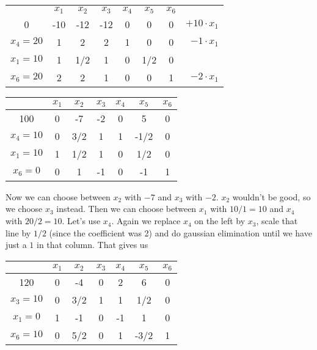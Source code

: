 \begin{Ex}
\begin{center}
\begin{tabular}{c|ccccccr}
  & $x_1$ & $x_2$ & $x_3$ & $x_4$ & $x_5$ & $x_6$ \\\cline{1-7}
0 & -10 & -12 & -12 & 0 & 0 & 0 &\hspace{1cm} $+10\cdot x_1$\\\cline{0-6}
$x_4=20$ & 1 & 2   & 2 & 1 &  0   & 0 &\hspace{1cm} $-1\cdot x_1$\\
$x_1=10$ & 1 & 1/2 & 1 & 0 &  1/2 & 0\\
$x_6=20$ & 2 & 2   & 1 & 0 &  0   & 1 &\hspace{1cm} $-2\cdot x_1$\\
\end{tabular}
\end{center}

\begin{center}
\begin{tabular}{c|cccccc}
  & $x_1$ & $x_2$ & $x_3$ & $x_4$ & $x_5$ & $x_6$ \\\hline
100 & 0 & -7 & -2 & 0 & 5 & 0\\\hline
$x_4=10$ & 0 & 3/2 & 1 & 1 & -1/2 & 0 \\
$x_1=10$ & 1 & 1/2 & 1 & 0 &  1/2 & 0\\
$x_6= 0$ & 0 & 1 & -1 & 0 & -1 &  1\\
\end{tabular}
\end{center}

Now we can choose between $x_2$ with $-7$ and $x_3$ with $-2$. $x_2$ wouldn't be good, %
so we choose $x_3$ instead. Then we can choose between $x_1$ with $10/1=10$ and $x_4$ with $20/2=10$. Let's use $x_4$. Again we replace $x_4$ on the left by $x_3$, scale that line by $1/2$ (since the coefficient was 2) and do gaussian elimination until we have just a $1$ in that column. That gives us

\begin{center}
\begin{tabular}{c|cccccc}
  & $x_1$ & $x_2$ & $x_3$ & $x_4$ & $x_5$ & $x_6$ \\\hline
120 & 0 & -4 & 0 & 2 & 6 & 0\\\hline
$x_3=10$ & 0 & 3/2 & 1 & 1 & 1/2 & 0 \\
$x_1=0$ &1  & -1 & 0 & -1 &  1 & 0\\
$x_6=10$ & 0 & \cellcolor{gruen}5/2 & 0 & 1 & -3/2 &  1\\
\end{tabular}
\end{center}


\end{Ex}
